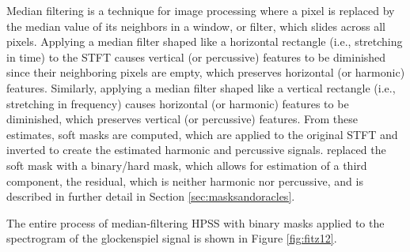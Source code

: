 \documentclass[report.tex]{subfiles}
\begin{document}
Median filtering is a technique for image processing where a pixel is replaced by the median value of its neighbors in a window, or filter, which slides across all pixels. Applying a median filter shaped like a horizontal rectangle (i.e., stretching in time) to the STFT causes vertical (or percussive) features to be diminished since their neighboring pixels are empty, which preserves horizontal (or harmonic) features. Similarly, applying a median filter shaped like a vertical rectangle (i.e., stretching in frequency) causes horizontal (or harmonic) features to be diminished, which preserves vertical (or percussive) features. From these estimates, soft masks are computed, which are applied to the original STFT and inverted to create the estimated harmonic and percussive signals. \textcite{driedger} replaced the soft mask with a binary/hard mask, which allows for estimation of a third component, the residual, which is neither harmonic nor percussive, and is described in further detail in Section \ref{sec:masksandoracles}.

The entire process of median-filtering HPSS with binary masks applied to the spectrogram of the glockenspiel signal is shown in Figure \ref{fig:fitz12}.
\end{document}
